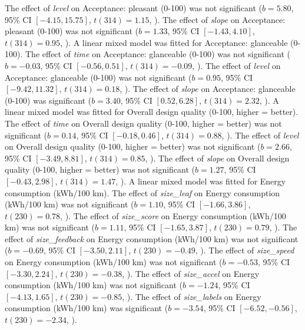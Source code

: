 The effect of \textit{level} on Acceptance: pleasant (0-100) was not significant ($b = 5.80$, 95\% CI $[-4.15, 15.75]$, $t(314) = 1.15$, ).
The effect of \textit{slope} on Acceptance: pleasant (0-100) was not significant ($b = 1.33$, 95\% CI $[-1.43, 4.10]$, $t(314) = 0.95$, ).
A linear mixed model was fitted for Acceptance: glanceable (0-100).
The effect of \textit{time} on Acceptance: glanceable (0-100) was not significant ($b = -0.03$, 95\% CI $[-0.56, 0.51]$, $t(314) = -0.09$, ).
The effect of \textit{level} on Acceptance: glanceable (0-100) was not significant ($b = 0.95$, 95\% CI $[-9.42, 11.32]$, $t(314) = 0.18$, ).
The effect of \textit{slope} on Acceptance: glanceable (0-100) was significant ($b = 3.40$, 95\% CI $[0.52, 6.28]$, $t(314) = 2.32$, ).
A linear mixed model was fitted for Overall design quality (0-100, higher = better).
The effect of \textit{time} on Overall design quality (0-100, higher = better) was not significant ($b = 0.14$, 95\% CI $[-0.18, 0.46]$, $t(314) = 0.88$, ).
The effect of \textit{level} on Overall design quality (0-100, higher = better) was not significant ($b = 2.66$, 95\% CI $[-3.49, 8.81]$, $t(314) = 0.85$, ).
The effect of \textit{slope} on Overall design quality (0-100, higher = better) was not significant ($b = 1.27$, 95\% CI $[-0.43, 2.98]$, $t(314) = 1.47$, ).
A linear mixed model was fitted for Energy consumption (kWh/100 km).
The effect of \textit{size\_leaf} on Energy consumption (kWh/100 km) was not significant ($b = 1.10$, 95\% CI $[-1.66, 3.86]$, $t(230) = 0.78$, ).
The effect of \textit{size\_score} on Energy consumption (kWh/100 km) was not significant ($b = 1.11$, 95\% CI $[-1.65, 3.87]$, $t(230) = 0.79$, ).
The effect of \textit{size\_feedback} on Energy consumption (kWh/100 km) was not significant ($b = -0.69$, 95\% CI $[-3.50, 2.11]$, $t(230) = -0.49$, ).
The effect of \textit{size\_speed} on Energy consumption (kWh/100 km) was not significant ($b = -0.53$, 95\% CI $[-3.30, 2.24]$, $t(230) = -0.38$, ).
The effect of \textit{size\_accel} on Energy consumption (kWh/100 km) was not significant ($b = -1.24$, 95\% CI $[-4.13, 1.65]$, $t(230) = -0.85$, ).
The effect of \textit{size\_labels} on Energy consumption (kWh/100 km) was significant ($b = -3.54$, 95\% CI $[-6.52, -0.56]$, $t(230) = -2.34$, ).
